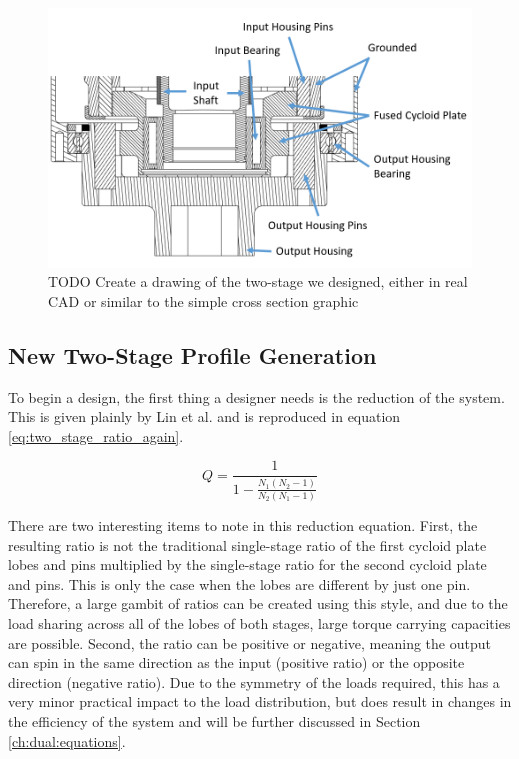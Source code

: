 \begin{figure}[h]
	\centering
	\includegraphics[width=0.70\linewidth]{fig/two_stage_cross_section_labeled}
   \caption{TODO Create a drawing of the two-stage we designed, either in real CAD or similar to the simple cross section graphic}
   \label{fig:two_stage_design}
\end{figure}

\subsection{New Two-Stage Profile Generation} \label{ch:dual:initial_equation:profiles}

To begin a design, the first thing a designer needs is the reduction of the system. This is given plainly by Lin et al. and is reproduced in equation \ref{eq:two_stage_ratio_again}.

\begin{equation} \label{eq:two_stage_ratio_again}
Q = \frac{1}{1 - \frac{N_1 (N_2-1)}{N_2 (N_1-1)}}
\end{equation}

There are two interesting items to note in this reduction equation. First, the resulting ratio is not the traditional single-stage ratio of the first cycloid plate lobes and pins multiplied by the single-stage ratio for the second cycloid plate and pins. This is only the case when the lobes are different by just one pin. Therefore, a large gambit of ratios can be created using this style, and due to the load sharing across all of the lobes of both stages, large torque carrying capacities are possible. Second, the ratio can be positive or negative, meaning the output can spin in the same direction as the input (positive ratio) or the opposite direction (negative ratio). Due to the symmetry of the loads required, this has a very minor practical impact to the load distribution, but does result in changes in the efficiency of the system and will be further discussed in Section \ref{ch:dual:equations}. 

